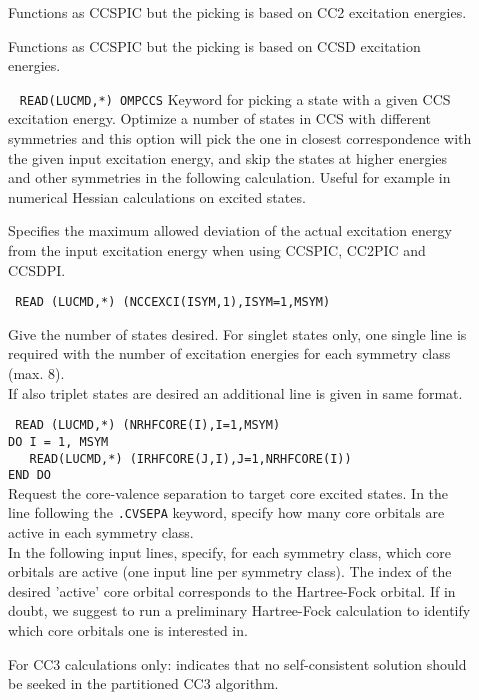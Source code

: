 \begin{description}
\item[] 
Functions as CCSPIC but the picking is based on CC2 excitation energies.
\item[] 
Functions as CCSPIC but the picking is based on CCSD excitation energies.
%
\item[] \verb| |\newline 
\verb|READ(LUCMD,*) OMPCCS| \newline
Keyword for picking a state with a given CCS excitation energy.
Optimize a number of states in CCS with different symmetries and this option
will pick the one in closest correspondence with the given input excitation
energy, and skip the states at higher energies and other symmetries in 
the following calculation.
Useful for example in numerical Hessian calculations on excited states.

\item[] 
Specifies the maximum allowed deviation of the actual excitation energy
from the input excitation energy when using CCSPIC, CC2PIC and CCSDPI. 

\item[] \verb| |\newline
\verb|READ (LUCMD,*) (NCCEXCI(ISYM,1),ISYM=1,MSYM)|

Give the number of states desired.
For singlet states only, one single line is required with
the number of excitation energies for each symmetry class (max. 8). \\ 
If also triplet states are desired an additional line is given in same format. 

\item[] \verb| |\newline
\verb|READ (LUCMD,*) (NRHFCORE(I),I=1,MSYM)|\\
\verb|DO I = 1, MSYM| \\
\verb|   READ(LUCMD,*) (IRHFCORE(J,I),J=1,NRHFCORE(I))| \\
\verb|END DO| \\
Request the core-valence separation to target core excited states.
In the line following the \verb+.CVSEPA+ keyword,
specify how many core orbitals are active in each symmetry class.\\
In the following input lines,
specify, for each symmetry class, which core orbitals are active
(one input line per symmetry class).
The index of the desired 'active' core orbital corresponds to 
the Hartree-Fock orbital. If in doubt, we suggest to run a 
preliminary Hartree-Fock calculation to identify which core 
orbitals one is interested in.\\
%
\item[] 
%
For CC3 calculations only: indicates that no self-consistent solution
should be seeked in the partitioned CC3 algorithm.


\end{description}
